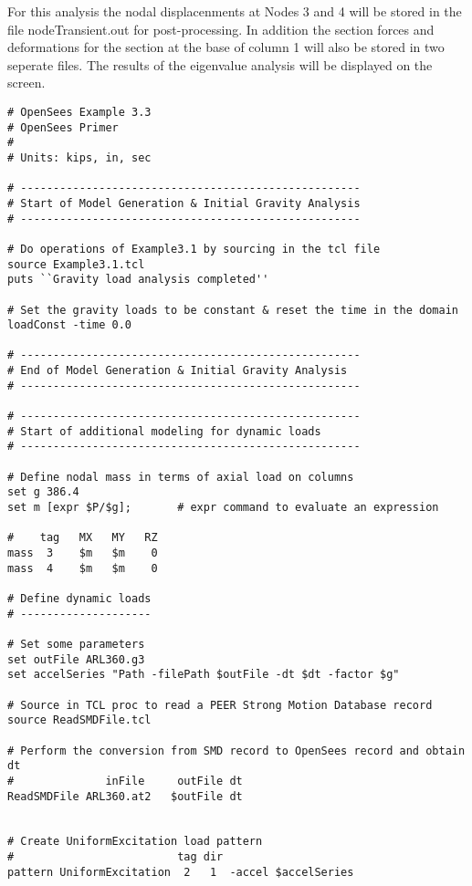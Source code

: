 \documentclass[12pt]{article}
\begin{document}
\vspace{0.2in} 

For this analysis the nodal displacenments at Nodes 3 and 4 will be stored in
the file nodeTransient.out for post-processing. In addition the
section forces and deformations for the section at the base of column
1 will also be stored in two seperate files.  The results of the
eigenvalue analysis will be displayed on the screen.

\vspace{0.2in} 

{\sf\small
\begin{verbatim}
# OpenSees Example 3.3
# OpenSees Primer
#
# Units: kips, in, sec

# ----------------------------------------------------
# Start of Model Generation & Initial Gravity Analysis
# ----------------------------------------------------

# Do operations of Example3.1 by sourcing in the tcl file
source Example3.1.tcl
puts ``Gravity load analysis completed''

# Set the gravity loads to be constant & reset the time in the domain
loadConst -time 0.0

# ----------------------------------------------------
# End of Model Generation & Initial Gravity Analysis
# ----------------------------------------------------

# ----------------------------------------------------
# Start of additional modeling for dynamic loads
# ----------------------------------------------------

# Define nodal mass in terms of axial load on columns
set g 386.4
set m [expr $P/$g];       # expr command to evaluate an expression

#    tag   MX   MY   RZ
mass  3    $m   $m    0
mass  4    $m   $m    0

# Define dynamic loads
# --------------------

# Set some parameters
set outFile ARL360.g3
set accelSeries "Path -filePath $outFile -dt $dt -factor $g"

# Source in TCL proc to read a PEER Strong Motion Database record
source ReadSMDFile.tcl

# Perform the conversion from SMD record to OpenSees record and obtain dt
#              inFile     outFile dt
ReadSMDFile ARL360.at2   $outFile dt


# Create UniformExcitation load pattern
#                         tag dir 
pattern UniformExcitation  2   1  -accel $accelSeries


\end{verbatim}}
\end{document}
